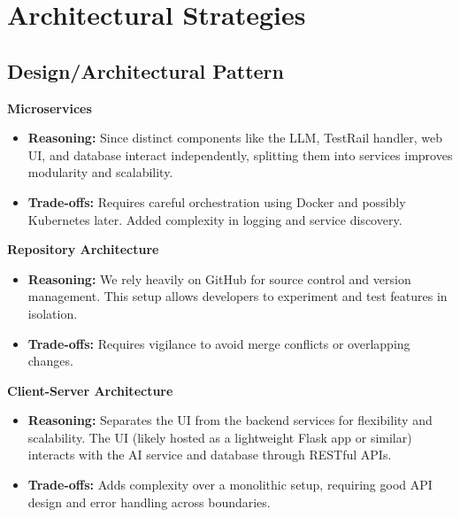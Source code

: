 \documentclass[12pt]{article}
\begin{document}
\section{Architectural Strategies}

\subsection{Design/Architectural Pattern}

\textbf{Microservices}

\begin{itemize}
    \item \textbf{Reasoning:} Since distinct components like the LLM, TestRail handler, web UI, and database interact independently, splitting them into services improves modularity and scalability.

    \item \textbf{Trade-offs:} Requires careful orchestration using Docker and possibly Kubernetes later. Added complexity in logging and service discovery.
\end{itemize}

\vspace{1em}

\textbf{Repository Architecture}

\begin{itemize}
    \item \textbf{Reasoning:} We rely heavily on GitHub for source control and version management. This setup allows developers to experiment and test features in isolation.

    \item \textbf{Trade-offs:} Requires vigilance to avoid merge conflicts or overlapping changes.
\end{itemize}

\vspace{1em}

\textbf{Client-Server Architecture}

\begin{itemize}
    \item \textbf{Reasoning:} Separates the UI from the backend services for flexibility and scalability. The UI (likely hosted as a lightweight Flask app or similar) interacts with the AI service and database through RESTful APIs.

    \item \textbf{Trade-offs:} Adds complexity over a monolithic setup, requiring good API design and error handling across boundaries.
\end{itemize}
\end{document}
